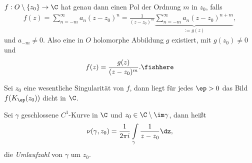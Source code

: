 \begin{cor}
\label{prop:2.84}
$f: O\setminus\{z_0\}\to\C$ hat genau dann einen Pol der Ordnung $m$ in $z_0$,
falls
\begin{align*}
f(z) = \sum\limits_{n=-m}^\infty a_n (z-z_0)^n =
\frac{1}{(z-z_0)^m}\underbrace{\sum\limits_{n=-m}^\infty a_n (z-z_0)^{n+m}}_{:=
g(z)},
\end{align*}
und $a_{-m}\neq 0$. Also eine in $O$ holomorphe Abbildung $g$ existiert,
mit $g(z_0)\neq 0$ und
\begin{align*}
f(z) = \frac{g(z)}{(z-z_0)^m}.\fishhere
\end{align*} 
\end{cor}

\begin{propn}
Sei $z_0$ eine wesentliche Singularität von $f$, dann liegt für jedes
 $\ep > 0$ das Bild $f(K_{\ep}(z_0))$ dicht in $\C$.\fishhere
\end{propn}

\begin{defn}
\label{defn:2.85}
Sei $\gamma$ geschlossene $C^1$-Kurve in $\C$ und
$z_0\in\C\setminus\im\gamma$, dann heißt
\begin{align*}
\nu(\gamma,z_0) = \frac{1}{2\pi i}\int\limits_\gamma \frac{1}{z-z_0}\dz,
\end{align*}
die \emph{Umlaufzahl} von $\gamma$ um $z_0$.\fishhere
\end{defn}


